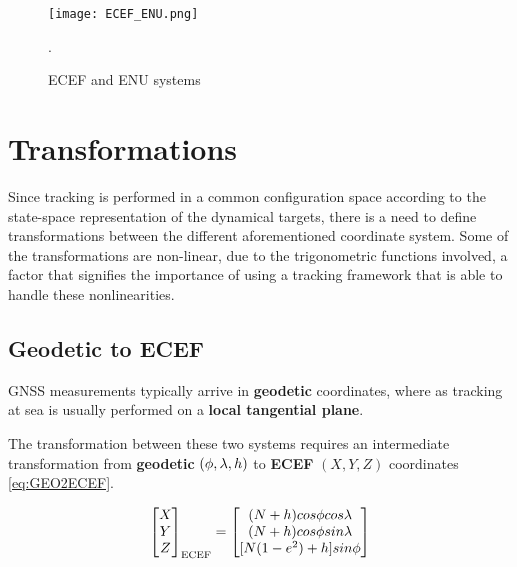 \begin{figure}[H]
	\centering
	\texttt{[image: ECEF\_ENU.png]}
	\caption{ECEF and ENU systems \cite{WikipediaENUFig}}.
\label{fig:ECEF_ENU}
\end{figure}


\section{Transformations}\label{sec:transformations}

Since tracking is performed in a common configuration space according to the state-space representation of the dynamical targets, there is a need to define transformations between the different aforementioned coordinate system. Some of the transformations are non-linear, due to the trigonometric functions involved, a factor that signifies the importance of using a tracking framework that is able to handle these nonlinearities.

\subsection{Geodetic to ECEF}\label{ssec:geodetic-to-ecef}

GNSS measurements typically arrive in  \textbf{geodetic} coordinates, where as tracking at sea is usually performed on a \textbf{local tangential plane}.


The transformation between these two systems requires an intermediate transformation from \textbf{geodetic} $(\phi,{\lambda},h)$ to \textbf{ECEF}   $(X,Y,Z)$ coordinates \eqref{eq:GEO2ECEF}.

\begin{equation} \label{eq:GEO2ECEF}
	\begin{bmatrix}
	X\\
	Y\\
	Z
	\end{bmatrix}_{\text{ECEF}} =
	\begin{bmatrix}
	(N+h)cos{\phi} cos{\lambda} \\
	(N+h)cos{\phi} sin{\lambda} \\
	[N(1-e^2)+h] sin{\phi}
	\end{bmatrix}
\end{equation}


